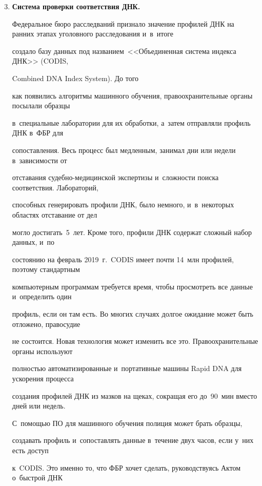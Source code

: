   \begin{enumerate}[1.]


  \setcounter{enumi}{2}


\item %


\textbf{Система проверки соответствия ДНК.}


Федеральное бюро расследваний признало значение профилей ДНК на ранних этапах уголовного расследования и~в~итоге


создало базу данных под названием~<<Объединенная сис\-те\-ма индекса ДНК>> (CODIS,


Combined DNA Index System). До того


как появились алгоритмы машинного обучения, правоохранительные органы посылали образцы


в~специальные лаборатории для их обработки, а~затем отправляли профиль ДНК в~ФБР для


сопоставления. Весь процесс был медленным, занимал дни или недели в~зависимости от


отставания су\-деб\-но-ме\-ди\-цин\-ской экспертизы и~слож\-ности поиска соответствия. Лабораторий,


способных генерировать профили ДНК, было немного, и~в~некоторых областях отставание от дел


могло достигать~5~лет. Кроме того, профили ДНК содержат сложный набор данных, и~по


состоянию на февраль 2019~г.\ CODIS имеет почти 14~млн профилей, поэтому стандартным


компьютерным программам требуется время, чтобы просмотреть все данные и~определить один


профиль, если он там есть. Во многих случаях долгое ожидание может быть отложено, правосудие


не состоится. Новая технология может изменить все это. Правоохранительные органы используют


полностью автоматизированные и~портативные машины Rapid DNA для ускорения процесса


создания профилей ДНК из мазков на щеках, сокращая его до~90~мин вместо дней или недель.


С~по\-мощью ПО для машинного обучения полиция может брать образцы,


создавать профиль и~сопоставлять данные в~течение двух часов, если у~них есть доступ


к~CODIS. Это именно то, что ФБР хочет сделать, руководствуясь Актом о~быстрой ДНК



\end{enumerate}
